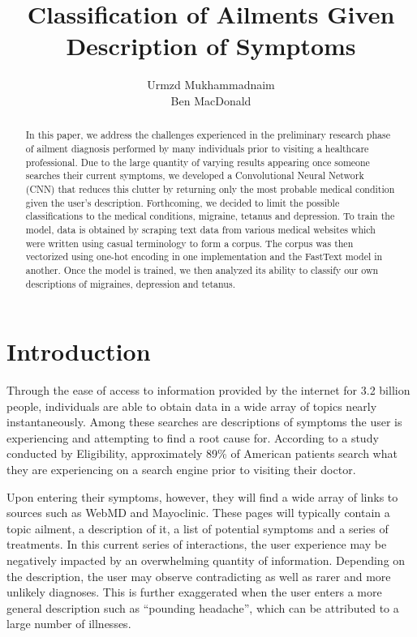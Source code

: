\documentclass[12pt]{report}
\title{Classification of Ailments Given Description of Symptoms}
\author{Urmzd Mukhammadnaim \\ Ben MacDonald}
\begin{document}
\maketitle
\tableofcontents
\begin{abstract}
	In this paper, we address the challenges experienced in the preliminary research phase
	of ailment diagnosis performed by many individuals prior to visiting a
	healthcare professional. Due to the large quantity of varying results appearing
	once someone searches their current symptoms, we developed a Convolutional
	Neural Network (CNN) that reduces this clutter by returning only the most
	probable medical condition given the user’s description. Forthcoming, we
	decided to limit the possible classifications to the medical conditions,
	migraine, tetanus and depression. To train the model, data is obtained by
	scraping text data from various medical websites which were written using
	casual terminology to form a corpus. The corpus was then vectorized using
	one-hot encoding in one implementation and the FastText model in another. Once
	the model is trained, we then analyzed its ability to classify our own
	descriptions of migraines, depression and tetanus.
\end{abstract}
\chapter{Introduction}
Through the ease of access to information provided by the internet for 3.2
billion people, individuals are able to obtain data in a wide array of topics
nearly instantaneously. Among these searches are descriptions of symptoms the
user is experiencing and attempting to find a root cause for. According to a
study conducted by Eligibility, approximately 89\% of American patients search
what they are experiencing on a search engine prior to visiting their doctor.

Upon entering their symptoms, however, they will find a wide array of links to
sources such as WebMD and Mayoclinic. These pages will typically contain a
topic ailment, a description of it, a list of potential symptoms and a series
of treatments. In this current series of interactions, the user experience may
be negatively impacted by an overwhelming quantity of information. Depending on
the description, the user may observe contradicting as well as rarer and more
unlikely diagnoses. This is further exaggerated when the user enters a more
general description such as “pounding headache”, which can be attributed to a
large number of illnesses.
\end{document}
